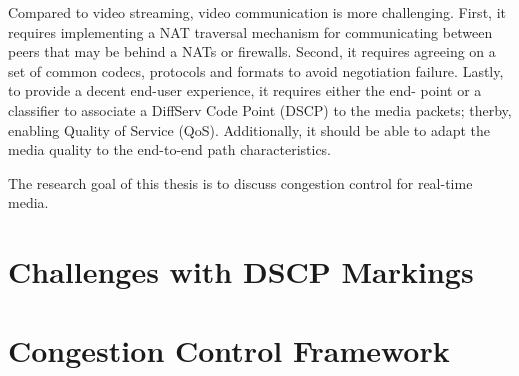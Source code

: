 
Compared to video streaming, video communication is more challenging. First,
it requires implementing a NAT traversal mechanism for communicating between
peers that may be behind a NATs or firewalls. Second, it requires agreeing on
a set of common codecs, protocols and formats to avoid negotiation failure.
Lastly, to provide  a decent end-user experience, it requires either the end-
point or a classifier to associate a DiffServ Code Point (DSCP) to the media
packets; therby, enabling Quality of Service (QoS). Additionally, it should be
able to adapt the media quality to the end-to-end path characteristics.

The research goal of this thesis is to discuss congestion control for real-time
media.

\section{Challenges with DSCP Markings}


\section{Congestion Control Framework}
